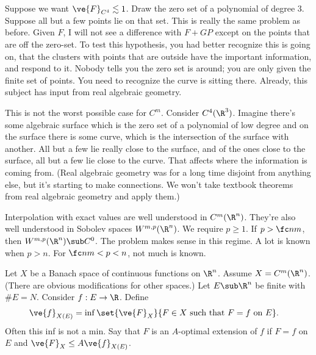 Suppose we want $\ve{F}_{C^4}\lesssim 1$. 
Draw the zero set of a polynomial of degree 3. Suppose all but a few points lie on that set. This is really the same problem as before. Given $F$, I will not see a difference with $F+GP$ except on the points that are off the zero-set. To test this hypothesis, you had better recognize this is going on, that the clusters with points that are outside have the important information, and respond to it.
Nobody tells you the zero set is around; you are only given the finite set of points. You need to recognize the curve is sitting there. Already, this subject  has input from real algebraic geometry.

This is not the worst possible case for $C^m$. Consider $C^4(\R^3)$. Imagine there's some algebraic surface which is the zero set of a polynomial of low degree and on the surface there is some curve, which is the intersection of the surface with another. All but a few lie really close to the surface, and of the ones close to the surface, all but a few lie close to the curve. That affects where the information is coming from. 
(Real algebraic geometry was for a long time disjoint from anything else, but it's starting to make connections. We won't take textbook theorems from real algebraic geometry and apply them.)

Interpolation with exact values are well understood in $C^m(\R^n)$. They're also well understood in Sobolev spaces $W^{m,p}(\R^n)$. We require $p\ge 1$. If $p>\fc nm$, then $W^{m,p}(\R^n)\sub C^0$. 
The problem makes sense in this regime. A lot is known when $p>n$. For $\fc nm < p< n$, not much is known.

Let $X$ be a Banach space of continuous functions on $\R^n$. Assume $X=C^m(\R^n)$. (There are obvious modifications for other spaces.) %
Let $E\sub \R^n$ be finite with $\# E=N$. %
Consider $f:E\to \R$. 
Define
\begin{align}
\ve{f}_{X(E)} &= \inf\set{\ve{F}_X}{F\in X \text{ such that } F=f\text{ on }E}.
\end{align}
Often this inf is not a min. 
Say that $F$ is an $A$-optimal extension of $f$ if $F=f$ on $E$ and $\ve{F}_X \le A\ve{f}_{X(E)}$. 

